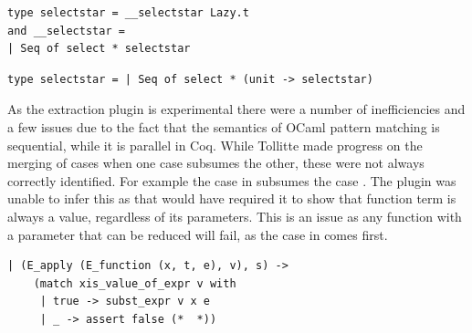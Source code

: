 \documentclass[12pt,twoside,notitlepage]{report}
\begin{document}
\vspace{3mm}
\begin{minipage}{\linewidth}

\begin{lstlisting}[caption={OCaml lazy selectstar}, label={lst:ocamllazystar}]
type selectstar = __selectstar Lazy.t
and __selectstar =
| Seq of select * selectstar
\end{lstlisting}

\end{minipage}

\begin{minipage}{\linewidth}

\begin{lstlisting}[caption={OCaml stream selectstar}, label={lst:ocamlstreamstar}]
type selectstar = | Seq of select * (unit -> selectstar) 
\end{lstlisting}

\end{minipage}

As the extraction plugin is experimental there were a number of inefficiencies and a few issues due to the fact that the semantics of OCaml pattern matching is sequential, while it is parallel in Coq. While Tollitte\cite{tollitte2012producing} made progress on the merging of cases when one case subsumes the other, these were not always correctly identified. For example the case  in  subsumes the case . The plugin was unable to infer this as that would have required it to show that function term is always a value, regardless of its parameters. This is an issue as any function with a parameter that can be reduced will fail, as the case in  comes first.


\vspace{3mm}

\begin{minipage}{\linewidth}

\begin{lstlisting}[caption={OCaml original substitution case}, label={lst:ocamlorigsub}]
  | (E_apply (E_function (x, t, e), v), s) ->
    (match xis_value_of_expr v with
     | true -> subst_expr v x e
     | _ -> assert false (*  *))
\end{lstlisting}

\end{minipage}
\end{document}
